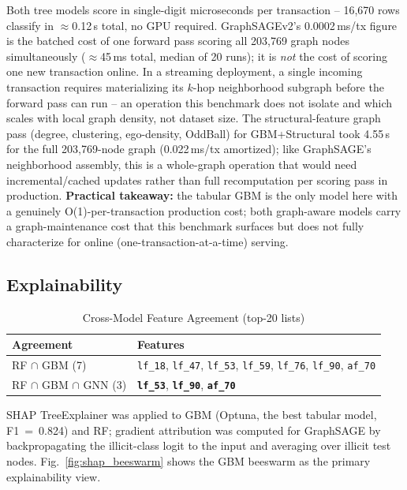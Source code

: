 \documentclass[conference]{IEEEtran}
\begin{document}
Both tree models score in single-digit microseconds per transaction --
16{,}670 rows classify in $\approx$0.12\,s total, no GPU required.
GraphSAGEv2's 0.0002\,ms/tx figure is the batched cost of one forward pass
scoring all 203{,}769 graph nodes simultaneously ($\approx$45\,ms total,
median of 20 runs); it is \emph{not} the cost of scoring one new
transaction online. In a streaming deployment, a single incoming
transaction requires materializing its $k$-hop neighborhood subgraph before
the forward pass can run -- an operation this benchmark does not isolate
and which scales with local graph density, not dataset size. The
structural-feature graph pass (degree, clustering, ego-density, OddBall)
for GBM+Structural took 4.55\,s for the full 203{,}769-node graph
(0.022\,ms/tx amortized); like GraphSAGE's neighborhood assembly, this is a
whole-graph operation that would need incremental/cached updates rather
than full recomputation per scoring pass in production. \textbf{Practical
takeaway:} the tabular GBM is the only model here with a genuinely
O(1)-per-transaction production cost; both graph-aware models carry a
graph-maintenance cost that this benchmark surfaces but does not fully
characterize for online (one-transaction-at-a-time) serving.

\subsection{Explainability}
\label{sec:explain}

\begin{table}[htbp]
\centering
\caption{Cross-Model Feature Agreement (top-20 lists)}
\label{tab:shap}
\renewcommand{\arraystretch}{1.1}
\begin{tabular}{@{}lp{5.0cm}@{}}
\toprule
Agreement & Features \\
\midrule
RF $\cap$ GBM (7) &
  \texttt{lf\_18}, \texttt{lf\_47}, \texttt{lf\_53},
  \texttt{lf\_59}, \texttt{lf\_76}, \texttt{lf\_90}, \texttt{af\_70} \\[2pt]
RF $\cap$ GBM $\cap$ GNN (3) &
  \textbf{\texttt{lf\_53}}, \textbf{\texttt{lf\_90}},
  \textbf{\texttt{af\_70}} \\
\bottomrule
\end{tabular}
\end{table}

SHAP TreeExplainer was applied to GBM (Optuna, the best tabular model,
F1~=~0.824) and RF; gradient attribution was computed for GraphSAGE by
backpropagating the illicit-class logit to the input and averaging over
illicit test nodes.  Fig.~\ref{fig:shap_beeswarm} shows the GBM beeswarm
as the primary explainability view.
\end{document}
